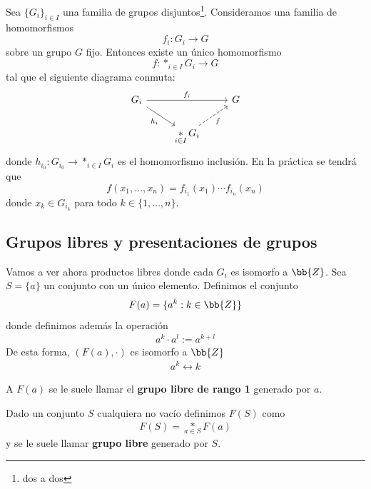 
\begin{lema}
    Sea $\{G_i\}_{i\in I}$ una familia de grupos disjuntos\footnote{dos a dos}. Consideramos una familia de homomorfismos
    \[
        f_i: G_i \to G
    \]
    sobre un grupo $G$ fijo. Entonces existe un único homomorfismo
    \[
        f : \mathop{\ast}_{i\in I} G_i \to G
    \]
    tal que el siguiente diagrama conmuta:
    \[
    \begin{tikzcd}
        G_i \arrow[rr, "f_i"] \arrow[dr, "h_i"'] & & G \\
        & \displaystyle\mathop{\ast}_{i\in I} G_i \arrow[ur, dashed, "f"'] &
    \end{tikzcd}
    \]
    donde $h_{i_0}:G_{i_0}\to \mathop{\ast}_{i\in I} G_i$ es el homomorfismo inclusión. En la práctica se tendrá que 
    \[
        f(x_1,\dots,x_n) = f_{i_1}(x_1) \cdots f_{i_n}(x_n)
    \]
    donde $x_k \in G_{i_k}$ para todo $k\in \{1,\dots,n\}$.
\end{lema}

\subsection{Grupos libres y presentaciones de grupos}

Vamos a ver ahora productos libres donde cada $G_i$ es isomorfo a $\bb{Z}$. Sea $S=\{a\}$ un conjunto con un único elemento. Definimos el conjunto
\begin{gather*}
    F(a)=\{a^k : k\in \bb{Z}\}
\end{gather*}
donde definimos además la operación 
\begin{gather*}
    a^k \cdot a^l := a^{k+l}
\end{gather*}
De esta forma, $(F(a), \cdot)$ es isomorfo a $\bb{Z}$
\begin{gather*}
    a^k \leftrightarrow k
\end{gather*}

\begin{definicion}
    A $F(a)$ se le suele llamar el \textbf{grupo libre de rango 1} generado por $a$.
\end{definicion}

\begin{definicion}
    Dado un conjunto $S$ cualquiera no vacío definimos $F(S)$ como 
    \begin{gather*}
        F(S)=\underset{a\in S}\ast F(a)
    \end{gather*}
    y se le suele llamar \textbf{grupo libre} generado por $S$.
\end{definicion}

